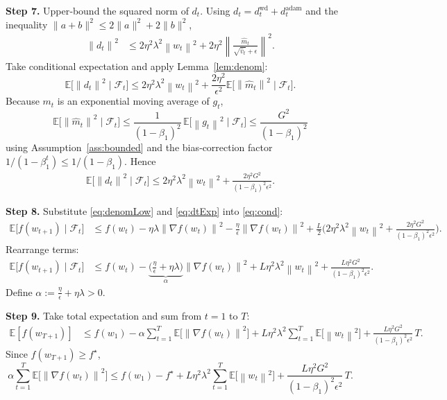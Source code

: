 \documentclass{article}
\newcommand{\E}{\mathbb{E}}
\newcommand{\norm}[1]{\left\|#1\right\|}
\begin{document}
\noindent\textbf{Step 7.} Upper‑bound the squared norm of $d_{t}$.
Using $d_{t}=d_{t}^{\text{wd}}+d_{t}^{\text{adam}}$ and the inequality $\|a+b\|^{2}\le 2\|a\|^{2}+2\|b\|^{2}$,
\begin{align}
\norm{d_{t}}^{2}
&\le 2\eta^{2}\lambda^{2}\norm{w_{t}}^{2}
   + 2\eta^{2}\norm{\frac{\hat m_{t}}{\sqrt{\hat v_{t}}+\epsilon}}^{2}.
\label{eq:dtBound}
\end{align}
Take conditional expectation and apply Lemma~\ref{lem:denom}:
\[
\E\!\big[\norm{d_{t}}^{2}\mid\mathcal{F}_{t}\big]
\le 2\eta^{2}\lambda^{2}\norm{w_{t}}^{2}
   + \frac{2\eta^{2}}{\epsilon^{2}}\E\!\big[\norm{\hat m_{t}}^{2}\mid\mathcal{F}_{t}\big].
\]
Because $m_{t}$ is an exponential moving average of $g_{t}$,
\[
\E\!\big[\norm{\hat m_{t}}^{2}\mid\mathcal{F}_{t}\big]
\le \frac{1}{(1-\beta_{1})^{2}}\,\E\!\big[\norm{g_{t}}^{2}\mid\mathcal{F}_{t}\big]
\le \frac{G^{2}}{(1-\beta_{1})^{2}}
\]
using Assumption~\ref{ass:bounded} and the bias‑correction factor $1/(1-\beta_{1}^{t})\le 1/(1-\beta_{1})$.
Hence
\begin{align}
\E\!\big[\norm{d_{t}}^{2}\mid\mathcal{F}_{t}\big]
\le 2\eta^{2}\lambda^{2}\norm{w_{t}}^{2}
   + \frac{2\eta^{2}G^{2}}{(1-\beta_{1})^{2}\epsilon^{2}}.
\label{eq:dtExp}
\end{align}

\noindent\textbf{Step 8.} Substitute \eqref{eq:denomLow} and \eqref{eq:dtExp} into \eqref{eq:cond}:
\begin{align}
\E\!\big[f(w_{t+1})\mid\mathcal{F}_{t}\big]
&\le f(w_{t})
   - \eta\lambda \norm{\nabla f(w_{t})}^{2}
   - \frac{\eta}{\epsilon}\norm{\nabla f(w_{t})}^{2}
   + \frac{L}{2}\Big(
        2\eta^{2}\lambda^{2}\norm{w_{t}}^{2}
        + \frac{2\eta^{2}G^{2}}{(1-\beta_{1})^{2}\epsilon^{2}}
        \Big) .
\label{eq:afterSub}
\end{align}
Rearrange terms:
\begin{align}
\E\!\big[f(w_{t+1})\mid\mathcal{F}_{t}\big]
&\le f(w_{t})
   - \underbrace{\Big(\frac{\eta}{\epsilon}+\eta\lambda\Big)}_{\displaystyle \alpha}
     \norm{\nabla f(w_{t})}^{2}
   + L\eta^{2}\lambda^{2}\norm{w_{t}}^{2}
   + \frac{L\eta^{2}G^{2}}{(1-\beta_{1})^{2}\epsilon^{2}} .
\label{eq:rearr}
\end{align}
Define $\alpha:=\frac{\eta}{\epsilon}+\eta\lambda>0$.

\noindent\textbf{Step 9.} Take total expectation and sum from $t=1$ to $T$:
\begin{align}
\E[f(w_{T+1})]
&\le f(w_{1})
   - \alpha\sum_{t=1}^{T}\E\!\big[\norm{\nabla f(w_{t})}^{2}\big]
   + L\eta^{2}\lambda^{2}\sum_{t=1}^{T}\E\!\big[\norm{w_{t}}^{2}\big]
   + \frac{L\eta^{2}G^{2}}{(1-\beta_{1})^{2}\epsilon^{2}}\,T .
\label{eq:sum}
\end{align}
Since $f(w_{T+1})\ge f^{\star}$,
\[
\alpha\sum_{t=1}^{T}\E\!\big[\norm{\nabla f(w_{t})}^{2}\big]
\le f(w_{1})-f^{\star}
   + L\eta^{2}\lambda^{2}\sum_{t=1}^{T}\E\!\big[\norm{w_{t}}^{2}\big]
   + \frac{L\eta^{2}G^{2}}{(1-\beta_{1})^{2}\epsilon^{2}}\,T .
\tag{9.1}
\]
\end{document}
